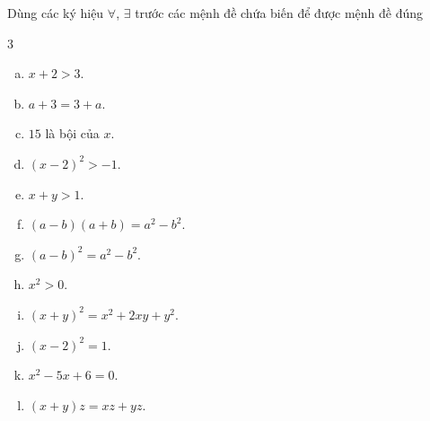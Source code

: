 \begin{bt}%
	 Dùng các ký hiệu $\forall$, $\exists$ trước các mệnh đề chứa biến để được mệnh đề đúng
	\begin{multicols}{3}
		\begin{enumerate}[a.]
			\item $x+2>3$. 
			\item $a+3=3+a$. 
			\item  $15$ là bội của $x$.
			\item $\left(x-2\right)^2>-1$. 
			 \item $x+y>1$.
			\item $(a-b)(a+b)=a^2-b^2$. 
			\item $\left(a-b\right)^2=a^2-b^2$. 
			 \item $x^2>0$.
			 \item $\left(x+y\right)^2=x^2+2xy+y^2$.
			\item $\left(x-2\right)^2=1$. 
			 \item $x^2-5x+6=0$.
			 \item $(x+y)z=xz+yz$.
		\end{enumerate}
	\end{multicols}
\end{bt}

